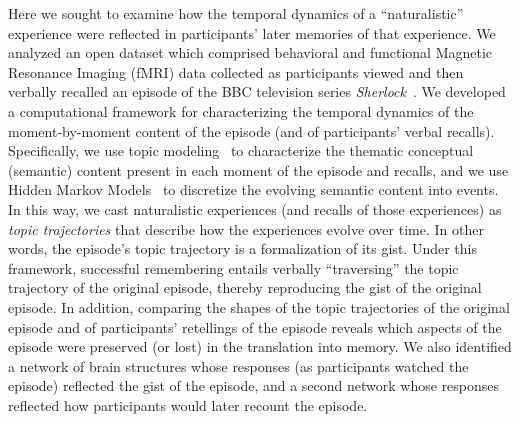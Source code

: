 \documentclass{article}
\begin{document}
Here we sought to examine how the temporal dynamics of a ``naturalistic'' experience were reflected in participants' later memories of that experience.  We analyzed an open dataset which comprised behavioral and functional Magnetic Resonance Imaging (fMRI) data collected as participants viewed and then verbally recalled an episode of the BBC television series \textit{Sherlock}~\citep{ChenEtal17}.  We developed a computational framework for characterizing the temporal dynamics of the moment-by-moment content of the episode (and of participants' verbal recalls).  Specifically, we use topic modeling~\citep{BleiEtal03} to characterize the thematic conceptual (semantic) content present in each moment of the episode and recalls, and we use Hidden Markov Models~\citep{Rabi89, BaldEtal17} to discretize the evolving semantic content into events.  In this way, we cast naturalistic experiences (and recalls of those experiences) as \textit{topic trajectories} that describe how the experiences evolve over time.  In other words, the episode's topic trajectory is a formalization of its gist.  Under this framework, successful remembering entails verbally ``traversing'' the topic trajectory of the original episode, thereby reproducing the gist of the original episode.  In addition, comparing the shapes of the topic trajectories of the original episode and of participants' retellings of the episode reveals which aspects of the episode were preserved (or lost) in the translation into memory.  We also identified a network of brain structures whose responses (as participants watched the episode) reflected the gist of the episode, and a second network whose responses reflected how participants would later recount the episode.
\end{document}
